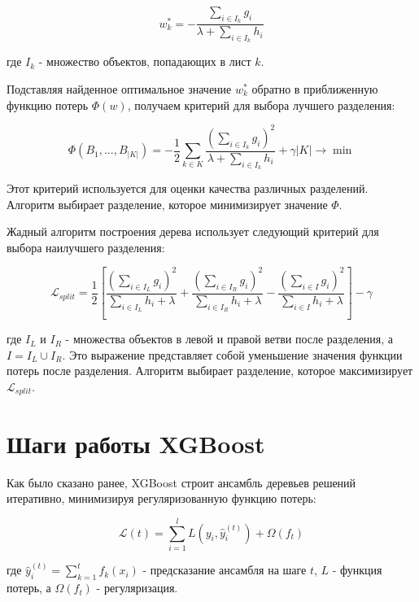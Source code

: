 \[
w_k^* = - \frac{\sum_{i \in I_k} g_i}{\lambda + \sum_{i \in I_k} h_i}
\]

где $I_k$ - множество объектов, попадающих в лист $k$.

Подставляя найденное оптимальное значение $w_k^*$ обратно в приближенную функцию потерь $\Phi(w)$, получаем критерий для выбора лучшего разделения:

\[
\Phi(B_1, ..., B_{|K|}) = - \frac{1}{2} \sum_{k \in K} \frac{(\sum_{i \in I_k} g_i)^2}{\lambda + \sum_{i \in I_k} h_i} + \gamma|K| \rightarrow \min
\]

Этот критерий используется для оценки качества различных разделений. Алгоритм выбирает разделение, которое минимизирует значение $\Phi$.

Жадный алгоритм построения дерева использует следующий критерий для выбора наилучшего разделения:

\[
\mathcal{L}_{split} = \frac{1}{2} \left[ \frac{(\sum_{i \in I_L} g_i)^2}{\sum_{i \in I_L} h_i + \lambda} + \frac{(\sum_{i \in I_R} g_i)^2}{\sum_{i \in I_R} h_i + \lambda} - \frac{(\sum_{i \in I} g_i)^2}{\sum_{i \in I} h_i + \lambda} \right] - \gamma
\]

где $I_L$ и $I_R$ - множества объектов в левой и правой ветви после разделения, а $I = I_L \cup I_R$.  Это выражение представляет собой уменьшение значения функции потерь после разделения.  Алгоритм выбирает разделение, которое максимизирует $\mathcal{L}_{split}$.


\section{Шаги работы  XGBoost}
Как было сказано ранее, XGBoost строит ансамбль деревьев решений итеративно, минимизируя регуляризованную функцию потерь:

\[
\mathcal{L}(t) = \sum_{i=1}^l L(y_i, \hat{y}_i^{(t)}) + \Omega(f_t)
\]

где $\hat{y}_i^{(t)} = \sum_{k=1}^t f_k(x_i)$ - предсказание ансамбля на шаге $t$, $L$ - функция потерь, а $\Omega(f_t)$ - регуляризация.

